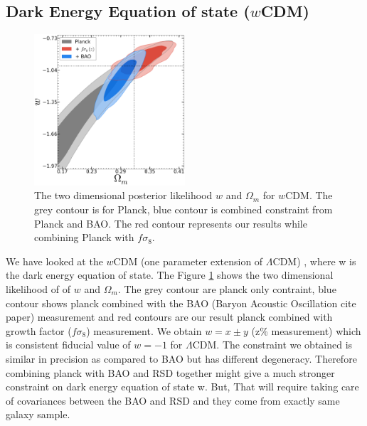 \subsection{Dark Energy Equation of state ($w$CDM)}
\begin{figure}
\includegraphics[width=0.5\textwidth]{plots/Like-2D/wCDM-omegam-w_2D.png}
\caption{The two dimensional posterior likelihood $w$ and $\Omega_m$  for $w$CDM. The grey contour is for Planck, blue contour is combined constraint from Planck and BAO. The red contour represents  our results while combining Planck with $f\sigma_8$.}
\label{fig:wCDM}
\end{figure}

We have looked at the $w$CDM (one parameter extension of $\Lambda$CDM) , where w is the dark energy equation of state.
The Figure \ref{fig:wCDM} shows the two dimensional likelihood of of $w$ and $\Omega_m$. The grey contour are planck only contraint, blue contour shows planck combined with the BAO (Baryon Acoustic Oscillation cite paper) measurement  and red contours are our result planck combined with growth factor ($f\sigma_8$) measurement. We obtain $w=x \pm y$ (z\% measurement) which is consistent fiducial value of $w=-1$ for $\Lambda$CDM. The constraint we obtained is similar in precision as compared to BAO but has different degeneracy. Therefore combining planck with BAO and RSD together might give a much stronger constraint on dark energy equation of state w.  But, That will require taking care of covariances between the BAO and RSD and they come from exactly same galaxy sample.

